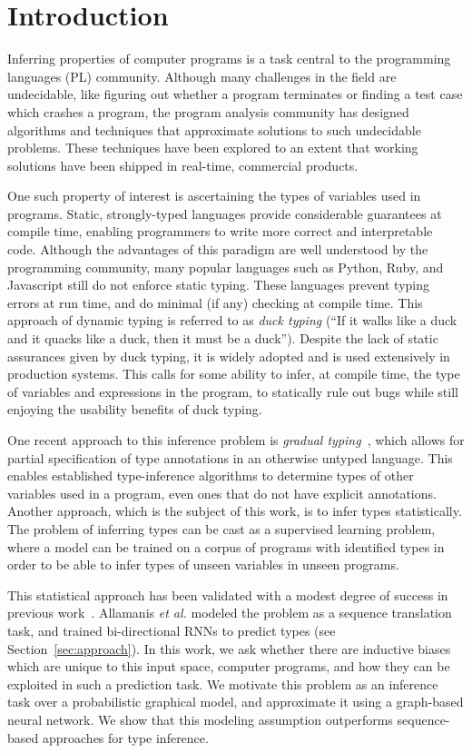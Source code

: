 \section{Introduction}
\label{sec:introduction}
Inferring properties of computer programs is a task central to the programming languages (PL) community.
Although many challenges in the field are undecidable, like figuring out whether a program terminates or finding a test case which crashes a program, the program analysis community has designed algorithms and techniques that approximate solutions to such undecidable problems.
These techniques have been explored to an extent that working solutions have been shipped in real-time, commercial products.

One such property of interest is ascertaining the types of variables used in programs.
Static, strongly-typed languages provide considerable guarantees at compile time, enabling programmers to write more correct and interpretable code.
Although the advantages of this paradigm are well understood by the programming community, many popular languages such as Python, Ruby, and Javascript still do not enforce static typing.
These languages prevent typing errors at run time, and do minimal (if any) checking at compile time.
This approach of dynamic typing is referred to as \textit{duck typing} (``If it walks like a duck and it quacks like a duck, then it must be a duck'').
Despite the lack of static assurances given by duck typing, it is widely adopted and is used extensively in production systems.
This calls for some ability to infer, at compile time, the type of variables and expressions in the program, to statically rule out bugs while still enjoying the usability benefits of duck typing.

One recent approach to this inference problem is \emph{gradual typing}~\cite{siek2006gradual}, which allows for partial specification of type annotations in an otherwise untyped language.
This enables established type-inference algorithms to determine types of other variables used in a program, even ones that do not have explicit annotations.
Another approach, which is the subject of this work, is to infer types statistically.
The problem of inferring types can be cast as a supervised learning problem, where a model can be trained on a corpus of programs with identified types in order to be able to infer types of unseen variables in unseen programs.

This statistical approach has been validated with a modest degree of success in previous work~\cite{hellendoorn2018deep}.
Allamanis \textit{et al.} modeled the problem as a sequence translation task, and trained bi-directional RNNs to predict types (see Section~\ref{sec:approach}).
In this work, we ask whether there are inductive biases which are unique to this input space, computer programs, and how they can be exploited in such a prediction task.
We motivate this problem as an inference task over a probabilistic graphical model, and approximate it using a graph-based neural network.
We show that this modeling assumption outperforms sequence-based approaches for type inference.